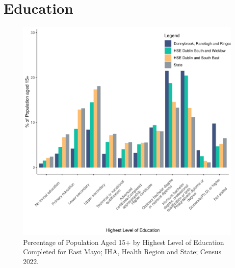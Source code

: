 \documentclass{article}
\begin{document}
\section{Education}\label{sect:Edu}
\begin{figure}[H]
	\centering
	\includegraphics[width = 120mm]{../figures/EduED.pdf}
	\caption{Percentage of Population Aged 15+ by Highest Level of Education Completed for East Mayo; IHA, Health Region and State; Census 2022.}
	\label{fig:vbnv}
	\end{figure}
\end{document}
